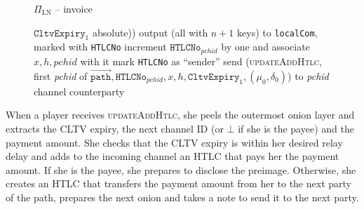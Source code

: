 \begin{figure}[H]
\begin{protocolbox}{$\Pi_{\mathrm{LN}}$ -- invoice}
\begin{algorithmic}[1]
          $\mathtt{CltvExpiry}_1$ absolute)) output (all with $n+1$ keys) to
          \texttt{localCom}, marked with \texttt{HTLCNo}
          \State increment $\mathtt{HTLCNo}_{\mathit{pchid}}$ by one and
          associate $x, h, \mathit{pchid}$ with it
          \State mark \texttt{HTLCNo} as ``sender''
          \State send (\textsc{updateAddHtlc}, first \textit{pchid} of
          $\overrightarrow{\mathtt{path}}, \mathtt{HTLCNo}_{\mathit{pchid}}, x,
          h, \mathtt{CltvExpiry}_1, \left(\mu_0, \delta_0\right)$) to
          \textit{pchid} channel counterparty
        \EndIndent
      \end{algorithmic}
    \end{protocolbox}
    \caption{}
    \label{alg:protocol:pay:invoice}
  \end{figure}

  When a player receives \textsc{updateAddHtlc}, she peels the outermost onion
  layer and extracts the CLTV expiry, the next channel ID (or $\bot$ if she is
  the payee) and the payment amount. She checks that the CLTV expiry is within
  her desired relay delay and adds to the incoming channel an HTLC that pays her
  the payment amount. If she is the payee, she prepares to disclose the
  preimage. Otherwise, she creates an HTLC that transfers the payment amount
  from her to the next party of the path, prepares the next onion and takes a
  note to send it to the next party.

